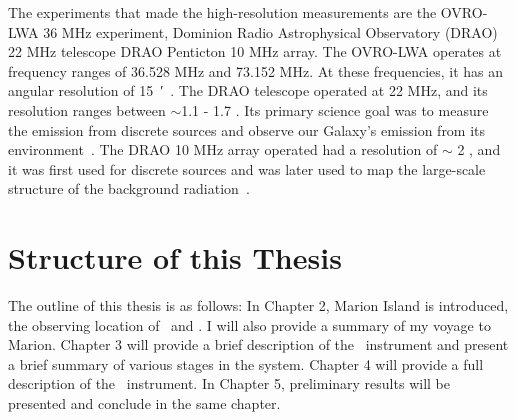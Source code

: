 	    The experiments that made the high-resolution measurements are the OVRO-LWA 36 MHz experiment, Dominion Radio Astrophysical Observatory (DRAO) 22 MHz telescope DRAO Penticton 10 MHz array. The OVRO-LWA operates at frequency ranges of 36.528 MHz and 73.152 MHz. At these frequencies, it has an angular resolution of \SI{15}{\arcminute}~\citep{2018AJ....156...32E}. The DRAO telescope operated at 22 MHz, and its resolution ranges between $\sim$1.1 \degree - 1.7 \degree. Its primary science goal was to measure the emission from discrete sources and observe our Galaxy's emission from its environment~\citep{1999A&AS..137....7R}. The DRAO 10 MHz array operated had a resolution of $\sim$ 2  \degree, and it was first used for discrete sources and was later used to map the large-scale structure of the background radiation~\citep{1976MNRAS.177..601C}.
	    
	    \section{Structure of this Thesis}
	    
	    
	    The outline of this thesis is as follows: In Chapter 2, 
	    Marion Island is introduced, the observing location of \prizm\ and \albatros. I will also provide a summary of my voyage to Marion. Chapter 3 will provide a brief description of the \prizm\ instrument and present a brief summary of various stages in the system. Chapter 4 will provide a full description of the \albatros\ instrument. In Chapter 5, preliminary results will be presented and conclude in the same chapter.  
 
		
